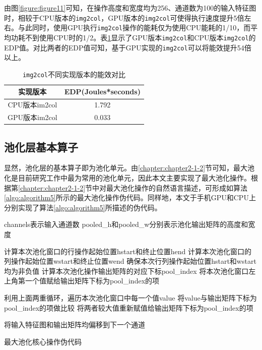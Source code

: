 由图\ref{figure:figure11}可知，在操作高度和宽度均为256、通道数为100的输入特征图时，相较于CPU版本的\texttt{img2col}，GPU版本的\texttt{img2col}可使得执行速度提升5倍左右。与此同时，使用GPU执行\texttt{img2col}操作的能耗仅为使用CPU能耗的1/10，而平均功耗不到使用CPU时的1/2。表\ref{table:table2}显示了GPU版本\texttt{img2col}和CPU版本\texttt{img2col}的EDP值。对比两者的EDP值可知，基于GPU实现的\texttt{img2col}可以将能效提升54倍以上。

\begin{table}[htbp]
  \centering
  \caption{\texttt{img2col}不同实现版本的能效对比}
  \label{table:table2}
  \begin{tabular}{cc}
    \toprule
      实现版本 & EDP(Joules*seconds) \\
    \midrule
      CPU版本im2col & 1.792 \\
      GPU版本im2col & 0.033 \\
    \bottomrule
  \end{tabular}
\end{table}


\subsection{池化层基本算子}

显然，池化层的基本算子即为池化单元。由\ref{chapter:chapter2-1-2}节可知，最大池化是目前研究工作中最为常用的池化单元，因此本文主要实现了最大池化操作。根据第\ref{chapter:chapter2-1-2}节中对最大池化操作的自然语言描述，可形成如算法\ref{algo:algorithm5}所示的最大池化操作伪代码。同样地，本文于手机GPU和CPU上分别实现了算法\ref{algo:algorithm5}所描述的伪代码。

\begin{algorithm}[htbp]
  \small
  \SetAlgoLined
    \begin{spacing}{0.8}
    channels表示输入通道数\;
    pooled\_h和pooled\_w分别表示池化输出矩阵的高度和宽度\;
     {
         {
             {
                计算本次池化窗口的行操作起始位置hstart和终止位置hend\;
                计算本次池化窗口的列操作起始位置wstart和终止位置wend\;
                确保本次行列操作起始位置hstart和wstart均为非负值\;
                计算本次池化操作输出矩阵的对应下标pool\_index\;
                将本次池化窗口左上角第一个值赋给输出矩阵下标为pool\_index的项\;

                 {
                     {
                      利用上面两重循环，遍历本次池化窗口中每一个值value\;
                        将value与输出矩阵下标为pool\_index的项做比较\;
                      将两者较大值重新赋值给输出矩阵下标为pool\_index的项\;
                    }
                }
            }
        }
        将输入特征图和输出矩阵均偏移到下一个通道\;
    }
    \end{spacing}
  \caption{最大池化核心操作伪代码}
  \label{algo:algorithm5}
\end{algorithm}

